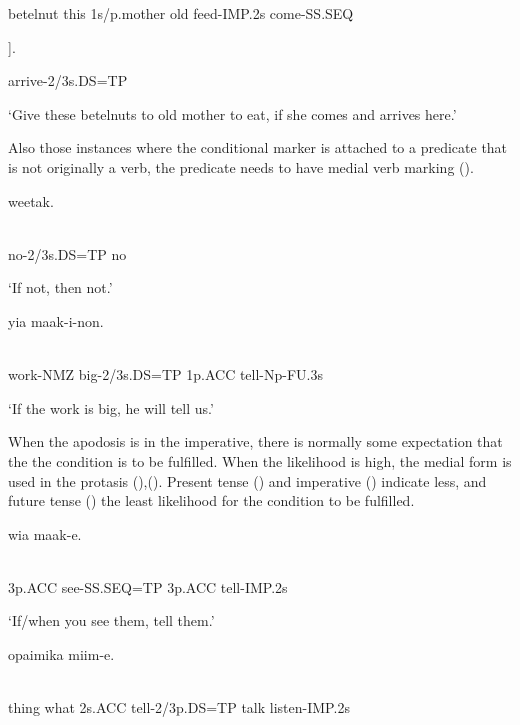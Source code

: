 betelnut  this  1s/p.mother  old  feed-IMP.2s  come-SS.SEQ

].

arrive-2/3s.DS=TP

`Give these betelnuts to old mother to eat, if she comes and arrives here.'

Also those instances where the conditional marker is attached to a predicate that is not originally a verb, the predicate needs to have medial verb marking ().

\ea%
\label{ex:x1660}
\gll [\textstyleEmphasizedVernacularWords{Weetak-eya}\textstyleEmphasizedVernacularWords{=na}]  weetak. \\
      \\
\glt
\z

no-2/3s.DS=TP  no

`If not, then not.'

\ea%
\label{ex:x1661}
\gll [Mauw-owa  \textstyleEmphasizedVernacularWords{manek-aya=na}]  yia  maak-i-non. \\
      \\
\glt
\z

work-NMZ  big-2/3s.DS=TP  1p.ACC  tell-Np-FU.3s

`If the work is big, he will tell us.'

When the apodosis is in the imperative, there is normally some expectation that the the condition is to be fulfilled. When the likelihood is high, the medial form is used in the protasis (),(). Present tense () and imperative () indicate less, and future tense () the least likelihood for the condition to be fulfilled.

\ea%
\label{ex:x1650}
\gll [Wia  \textstyleEmphasizedVernacularWords{uruf-ap=na}]  wia  maak-e. \\
      \\
\glt
\z

3p.ACC  see-SS.SEQ=TP  3p.ACC  tell-IMP.2s

`If/when you see them, tell them.'

\ea%
\label{ex:x1649}
\gll [Maa  mauwa  nefa  \textstyleEmphasizedVernacularWords{maak-iwkin=na}]  opaimika  miim-e. \\
      \\
\glt
\z

thing  what  2s.ACC  tell-2/3p.DS=TP  talk  listen-IMP.2s

